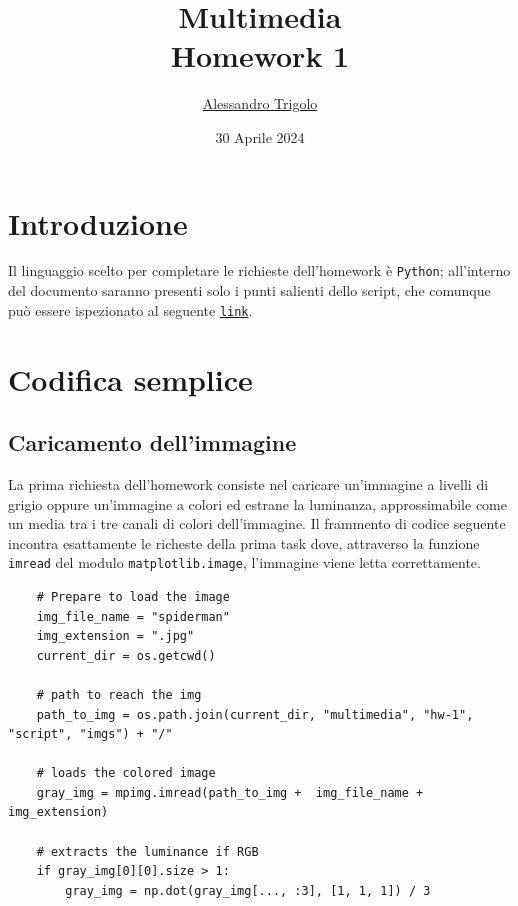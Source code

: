 \title{\vspace{160px} \textbf{\huge{Multimedia}} \\\vspace{17.5px} \LARGE{Homework 1}  \vspace{10px}}
\author{\href{https://github.com/imAlessas}{Alessandro Trigolo}}
\date{30 Aprile 2024}



\maketitle\newpage

\tableofcontents
\listoffigures
\vspace{20px}
\newpage

\listoftodos\newpage


\section*{Introduzione}
Il linguaggio scelto per completare le richieste dell'homework è \texttt{Python}; all'interno del documento saranno presenti solo i punti salienti dello script, che comunque può essere ispezionato al seguente \href{https://github.com/imAlessas/computer-networks/blob/main/multimedia/hw-1/script/lossless_coding.py}{\texttt{link}}.


\section{Codifica semplice} 


\vspace{15px}\subsection{Caricamento dell'immagine}
La prima richiesta dell'homework consiste nel caricare un'immagine a livelli di grigio oppure un'immagine a colori ed estrane la luminanza, approssimabile come un media tra i tre canali di colori dell'immagine. Il frammento di codice seguente incontra esattamente le richeste della prima task dove, attraverso la funzione \texttt{imread} del modulo \texttt{matplotlib.image}, l'immagine viene letta correttamente.

\begin{lstlisting}
    # Prepare to load the image
    img_file_name = "spiderman"
    img_extension = ".jpg"
    current_dir = os.getcwd()

    # path to reach the img
    path_to_img = os.path.join(current_dir, "multimedia", "hw-1", "script", "imgs") + "/"

    # loads the colored image
    gray_img = mpimg.imread(path_to_img +  img_file_name + img_extension) 

    # extracts the luminance if RGB
    if gray_img[0][0].size > 1:
        gray_img = np.dot(gray_img[..., :3], [1, 1, 1]) / 3
\end{lstlisting}

